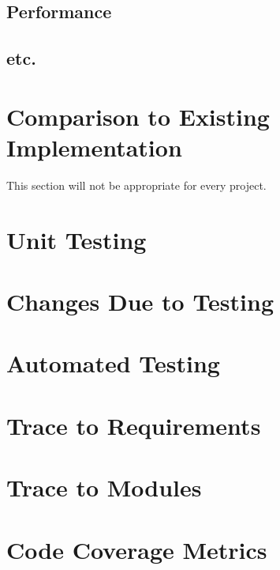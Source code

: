 \documentclass[12pt, titlepage]{article}
\begin{document}
\subsection{Performance}

\subsection{etc.}
	
\section{Comparison to Existing Implementation}	

This section will not be appropriate for every project.

\section{Unit Testing}

\section{Changes Due to Testing}

\section{Automated Testing}
		
\section{Trace to Requirements}
		
\section{Trace to Modules}		

\section{Code Coverage Metrics}




\end{document}
